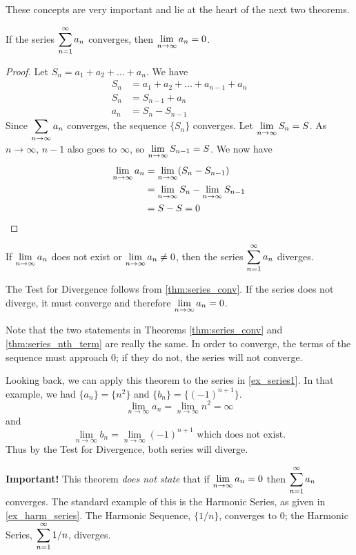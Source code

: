 These concepts are very important and lie at the heart of the next two theorems.

\begin{theorem}\label{thm:series_conv}%
If the series $\displaystyle \sum_{n=1}^\infty a_n$ converges, then $\displaystyle\lim_{n\to\infty}a_n=0$.
\end{theorem}

\begin{proof}
Let $S_n=a_1+a_2+\dots+a_n$. We have 
\begin{align*}
S_n&=a_1+a_2+\dots+a_{n-1}+a_n\\
S_n&=S_{n-1}+a_n\\
a_n&=S_n-S_{n-1}
\end{align*}
Since  $\displaystyle \sum_{n\to\infty}a_n$ converges, the sequence $\{ S_n\}$ converges.  Let $\displaystyle \lim_{n\to\infty} S_n=S$. As $n\to \infty$, $n-1$ also goes to $\infty$, so $\displaystyle \lim_{n\to\infty} S_{n-1}=S$. We now have
\begin{align*}
\lim_{n\to\infty} a_n&= \lim_{n\to\infty}(S_n-S_{n-1})\\
&= \lim_{n\to\infty}S_n - \lim_{n\to\infty} S_{n-1}\\
&=S-S=0\qedhere
\end{align*}
\end{proof}

\begin{theorem}\label{thm:series_nth_term}%
If $ \displaystyle \lim_{n\to\infty} a_n$ does not exist or $\displaystyle  \lim_{n\to\infty}a_n\neq0$, then the series $\displaystyle \sum_{n=1}^\infty a_n$ diverges.
\end{theorem}

The Test for Divergence follows from \autoref{thm:series_conv}. If the series does not diverge, it must converge and therefore $\displaystyle  \lim_{n\to\infty}a_n=0$.

Note that the two statements in Theorems \ref{thm:series_conv} and \ref{thm:series_nth_term} are really the same. In order to converge, the terms of the sequence must approach 0; if they do not, the series will not converge. 

Looking back, we can apply this theorem to the series in \autoref{ex_series1}. In that example, we had $\{a_n\} = \{n^2\}$ and $\{b_n\} = \{(-1)^{n+1}\}$.
\[\lim_{n\to\infty} a_n=\lim_{n\to\infty} n^2=\infty\]
and
\[\lim_{n\to\infty} b_n=\lim_{n\to\infty}(-1)^{n+1}\text{ which does not exist.}\]
Thus by the Test for Divergence, both series will diverge.

\textbf{Important!} This theorem \emph{does not state} that if $\displaystyle \lim_{n\to\infty} a_n = 0$ then $\displaystyle \sum_{n=1}^\infty  a_n $ converges. The standard example of this is the Harmonic Series, as given in \autoref{ex_harm_series}. The Harmonic Sequence, $\{1/n\}$, converges to 0; the Harmonic Series, $\displaystyle \sum_{n=1}^\infty 1/n$, diverges.

